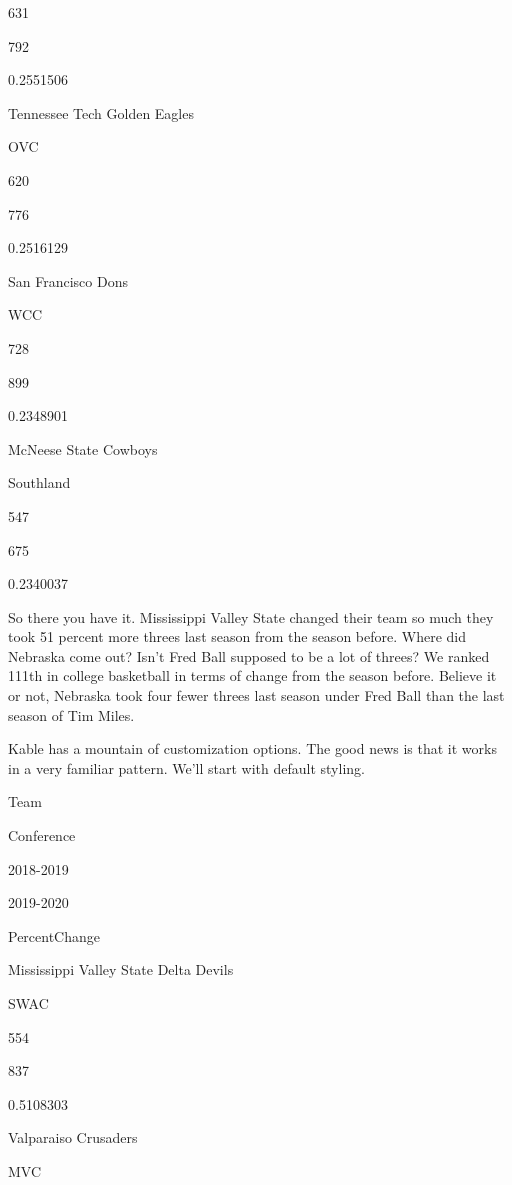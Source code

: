 \documentclass[
]{book}
\newenvironment{Shaded}{\begin{snugshade}}{\end{snugshade}}
\newcommand{\KeywordTok}[1]{\textcolor[rgb]{0.13,0.29,0.53}{\textbf{#1}}}
\newcommand{\NormalTok}[1]{#1}
\newcommand{\OperatorTok}[1]{\textcolor[rgb]{0.81,0.36,0.00}{\textbf{#1}}}
\newcommand{\StringTok}[1]{\textcolor[rgb]{0.31,0.60,0.02}{#1}}
\begin{document}
631

792

0.2551506

Tennessee Tech Golden Eagles

OVC

620

776

0.2516129

San Francisco Dons

WCC

728

899

0.2348901

McNeese State Cowboys

Southland

547

675

0.2340037

So there you have it. Mississippi Valley State changed their team so much they took 51 percent more threes last season from the season before. Where did Nebraska come out? Isn't Fred Ball supposed to be a lot of threes? We ranked 111th in college basketball in terms of change from the season before. Believe it or not, Nebraska took four fewer threes last season under Fred Ball than the last season of Tim Miles.

Kable has a mountain of customization options. The good news is that it works in a very familiar pattern. We'll start with default styling.

\begin{Shaded}
\end{Shaded}

Team

Conference

2018-2019

2019-2020

PercentChange

Mississippi Valley State Delta Devils

SWAC

554

837

0.5108303

Valparaiso Crusaders

MVC
\end{document}
